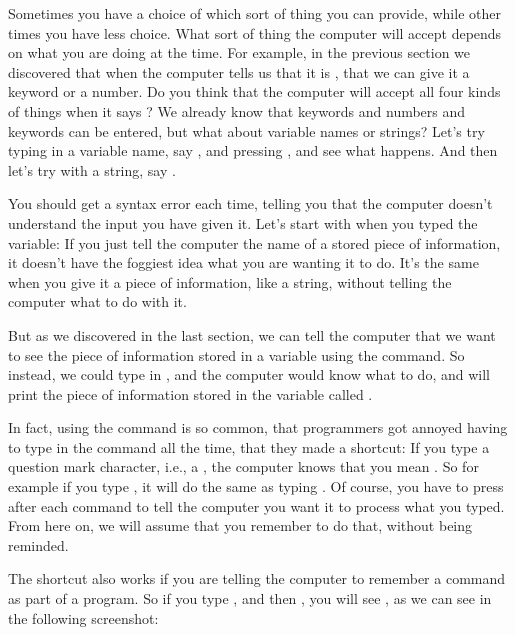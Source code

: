 \needspace{4cm} %
Sometimes you have a choice of which sort of thing you can provide, while other times you have less choice. What
sort of thing the computer will accept depends on what you are doing at the time.  For example, in the previous
section we discovered that when the computer tells us that it is , that we can give it
a keyword or a number.  Do you think that the computer will accept all four kinds of things when it says
?  We already know that keywords and numbers and keywords can be entered, but what about
variable names or strings?  Let's try typing in a variable name, say , and pressing ,
and see what happens.  And then let's try with a string, say .


You should get a syntax error each time, telling you that the computer doesn't understand the input you have given it.
Let's start with when you typed the variable: If you just tell the computer the name of a stored piece of information,
it doesn't have the foggiest idea what you are wanting it to do.  It's the same when you give it a piece of information,
like a string, without telling the computer what to do with it.

But as we discovered in the last section, we can tell the computer that we want to see the piece of information stored
in a variable using the  command.  So instead, we could type in , and
the computer would know what to do, and will print the piece of information stored in the variable called .

In fact, using the  command is so common, that programmers got annoyed having to type in the 
command all the time, that they made a shortcut: If you type a question mark character, i.e., a , the computer
knows that you mean .  So for example if you type , it will do the same as typing
.  Of course, you have to press  after each command to tell the computer
you want it to process what you typed.  From here on, we will assume that you remember to do that, without being reminded.

\needspace{4cm} %
The  shortcut also works if you are telling the computer to remember a command as part of a program.
So if you type , and then , you will see , as we can see
in the following screenshot:

